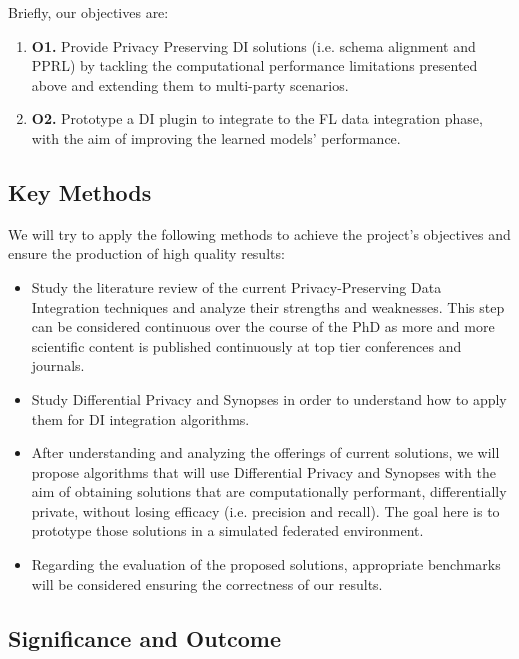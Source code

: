 \documentclass[12pt]{article}
\begin{document}
Briefly, our objectives are:
\begin{enumerate}
   \item \textbf{O1.} Provide Privacy Preserving DI solutions (i.e. schema alignment and PPRL) by tackling the computational performance limitations 
   presented above and extending them to multi-party scenarios.
   \item \textbf{O2.} Prototype a DI plugin to integrate to the FL data integration phase, with the aim of improving the 
   learned models' performance.
\end{enumerate}

\subsection{Key Methods}
We will try to apply the following methods to achieve the
project's objectives and ensure the production of high quality results:
\begin{itemize}
   \item Study the literature review of the current Privacy-Preserving Data Integration techniques and analyze their strengths 
   and weaknesses. This step can be considered continuous over the course of the PhD as more and more scientific content is 
   published continuously at top tier conferences and journals.%
   \item Study Differential Privacy and Synopses in order to understand how to apply them for DI integration algorithms.
   \item After understanding and analyzing the offerings of current solutions, we will propose algorithms that will 
   use Differential Privacy and Synopses with the aim of obtaining solutions that are computationally performant, differentially 
   private, without losing efficacy (i.e. precision and recall). 
   The goal here is to prototype those solutions in a simulated federated environment.
   \item Regarding the evaluation of the proposed solutions, appropriate benchmarks will be considered
   ensuring the correctness of our results.
\end{itemize}

\subsection{Significance and Outcome}
\end{document}
